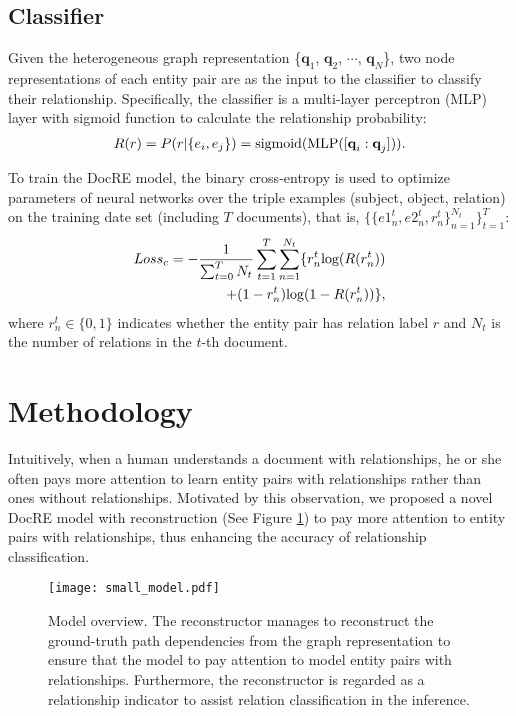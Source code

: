 \documentclass[letterpaper]{article} \usepackage{aaai21}  \usepackage{times}  \usepackage{helvet} \usepackage{courier}  \usepackage[hyphens]{url}  \usepackage{graphicx} \urlstyle{rm} \def\UrlFont{\rm}  \usepackage{natbib}  \usepackage{caption} \frenchspacing  \setlength{\pdfpagewidth}{8.5in}  \setlength{\pdfpageheight}{11in}  \usepackage{amsmath}
\begin{document}
\subsection{Classifier}
Given the heterogeneous graph representation \{$\textbf{q}_1$, $\textbf{q}_2$, $\cdots$, $\textbf{q}_N$\}, two node representations of each entity pair are as the input to the classifier to classify their relationship. 
Specifically, the classifier is a multi-layer perceptron (MLP) layer with sigmoid function to calculate the relationship probability:
\begin{equation}
\begin{aligned}
R(r) = P(r|\{e_i, e_j\}) = \textup{sigmoid}(\textup{MLP}([\textbf{q}_i:\textbf{q}_j])).
\label{eq:combinatefeature}
\end{aligned}
\end{equation}

To train the DocRE model, the binary cross-entropy is used to optimize parameters of neural networks over the triple examples (subject, object, relation) on the training date set (including $T$ documents), that is, $\{\{e1^t_n, e2^t_n, r^t_{n}\}^{N_t}_{n=1}\}^T_{t=1}$:  
\begin{equation}
\begin{split}
Loss_c=-\frac{1}{\sum_{t=0}^TN_t}\sum_{t=1}^T\sum_{n=1}^{N_t}\{r^t_n\textup{log}(R(r^t_n))\\
+(1-r^t_n)\textup{log}(1-R(r^t_n))\},
\end{split}
\label{eq5:TrainingLoss}
\end{equation}
where $r^t_n \in\{0,1\}$ indicates whether the entity pair has relation label $r$ and $N_t$ is the number of relations in the $t$-th document. 



\section{Methodology}
Intuitively, when a human understands a document with relationships, he or she often pays more attention to learn entity pairs with relationships rather than ones without relationships.
Motivated by this observation, we proposed a novel DocRE model with reconstruction (See Figure \ref{fig1:model}) to pay more attention to entity pairs with relationships, thus enhancing the accuracy of relationship classification.
\begin{figure}[h]
\centering
\texttt{[image: small\_model.pdf]} \caption{Model overview. The reconstructor manages to reconstruct the ground-truth path dependencies from the graph representation to ensure that the model to pay attention to model entity pairs with relationships. Furthermore, the reconstructor is regarded as a relationship indicator to assist relation classification in the inference.
}
\label{fig1:model}
\end{figure}
\end{document}
